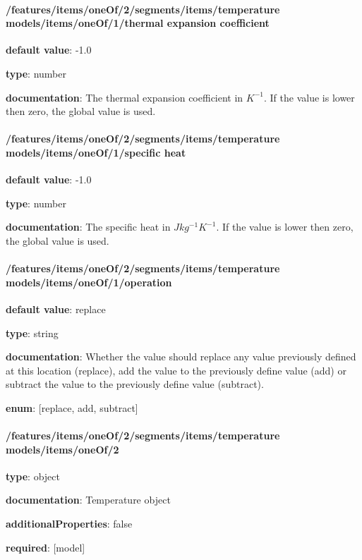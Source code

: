 \begin{itemized}
\end{itemized}\paragraph{/features/items/oneOf/2/segments/items/temperature models/items/oneOf/1/thermal expansion coefficient} \begin{itemized}
\item {\bf default value}: -1.0
\item {\bf type}: number
\item {\bf documentation}: The thermal expansion coefficient in $K^{-1}$. If the value is lower then zero, the global value is used.
\end{itemized}\paragraph{/features/items/oneOf/2/segments/items/temperature models/items/oneOf/1/specific heat} \begin{itemized}
\item {\bf default value}: -1.0
\item {\bf type}: number
\item {\bf documentation}: The specific heat in $J kg^{-1} K^{-1}$. If the value is lower then zero, the global value is used.
\end{itemized}\paragraph{/features/items/oneOf/2/segments/items/temperature models/items/oneOf/1/operation} \begin{itemized}
\item {\bf default value}: replace
\item {\bf type}: string
\item {\bf documentation}: Whether the value should replace any value previously defined at this location (replace), add the value to the previously define value (add) or subtract the value to the previously define value (subtract).
\item {\bf enum}: [replace, add, subtract]\end{itemized}\paragraph{/features/items/oneOf/2/segments/items/temperature models/items/oneOf/2} \begin{itemized}
\item {\bf type}: object
\item {\bf documentation}: Temperature object
\item {\bf additionalProperties}: false
\item {\bf required}: [model]\end{itemized}
